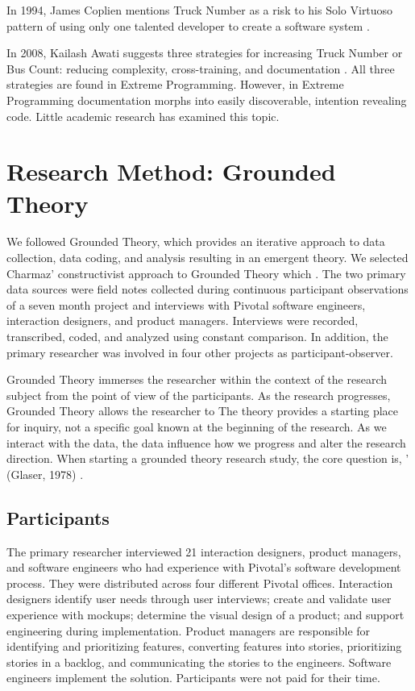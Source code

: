 In 1994, James Coplien mentions Truck Number as a risk to his Solo Virtuoso pattern of using only one talented developer to create a software system \cite{Coplien1994}. 

In 2008, Kailash Awati suggests three strategies for increasing Truck Number or Bus Count: reducing complexity, cross-training, and documentation \cite{AwatiBusFactor}. All three strategies are found in Extreme Programming. However, in Extreme Programming documentation morphs into easily discoverable, intention revealing code. Little academic research has examined this topic. 
\section{Research Method: Grounded Theory}
\label{ResearchMethod}

We followed Grounded Theory, \cite{Charmaz} which provides an iterative approach to data collection, data coding, and analysis resulting in an emergent theory. We selected Charmaz' constructivist approach to Grounded Theory which  \cite{StolGTinSE}. The two primary data sources were field notes collected during continuous participant observations of a seven month project and interviews with Pivotal software engineers, interaction designers, and product managers. Interviews were recorded, transcribed, coded, and analyzed using constant comparison. In addition, the primary researcher was involved in four other projects as participant-observer.

Grounded Theory immerses the researcher within the context of the research subject from the point of view of the participants. As the research progresses, Grounded Theory allows the researcher to  The theory provides a starting place for inquiry, not a specific goal known at the beginning of the research. As we interact with the data, the data influence how we progress and alter the research direction. When starting a grounded theory research study, the core question is, ' (Glaser, 1978) \cite{GlaserTheoreticalSensitivity}.

\subsection{Participants}
The primary researcher interviewed 21 interaction designers, product managers, and software engineers who had experience with Pivotal's software development process. They were distributed across four different Pivotal offices. Interaction designers identify user needs through user interviews; create and validate user experience with mockups; determine the visual design of a product; and support engineering during implementation. Product managers are responsible for identifying and prioritizing features, converting features into stories, prioritizing stories in a backlog, and communicating the stories to the engineers. Software engineers implement the solution. Participants were not paid for their time. 
